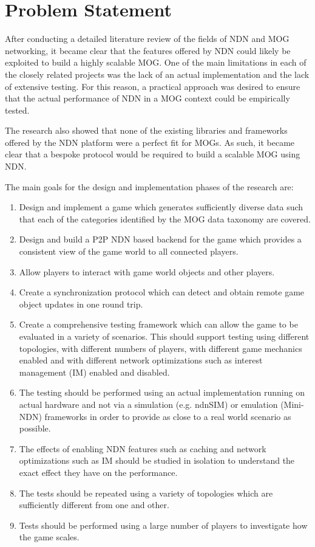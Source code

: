 \chapter{Problem Statement}\label{sec:problem-statement}
After conducting a detailed literature review of the fields of NDN and MOG networking, it became clear that the features offered by NDN could likely be exploited to build a highly scalable MOG. One of the main limitations in each of the closely related projects was the lack of an actual implementation and the lack of extensive testing. For this reason, a practical approach was desired to ensure that the actual performance of NDN in a MOG context could be empirically tested. 


The research also showed that none of the existing libraries and frameworks offered by the NDN platform were a perfect fit for MOGs. As such, it became clear that a bespoke protocol would be required to build a scalable MOG using NDN. 

The main goals for the design and implementation phases of the research are:

\begin{enumerate}
    \item Design and implement a game which generates sufficiently diverse data such that each of the categories identified by the MOG data taxonomy are covered.
    \item Design and build a P2P NDN based backend for the game which provides a consistent view of the game world to all connected players. 
    \item Allow players to interact with game world objects and other players.
    \item Create a synchronization protocol which can detect and obtain remote game object updates in one round trip.
    \item Create a comprehensive testing framework which can allow the game to be evaluated in a variety of scenarios. This should support testing using different topologies, with different numbers of players, with different game mechanics enabled and with different network optimizations such as interest management (IM) enabled and disabled.
    \item The testing should be performed using an actual implementation running on actual hardware and not via a simulation (e.g. ndnSIM) or emulation (Mini-NDN) frameworks in order to provide as close to a real world scenario as possible.
    \item The effects of enabling NDN features such as caching and network optimizations such as IM should be studied in isolation to understand the exact effect they have on the performance.
    \item The tests should be repeated using a variety of topologies which are sufficiently different from one and other.
    \item Tests should be performed using a large number of players to investigate how the game scales.      
\end{enumerate}

